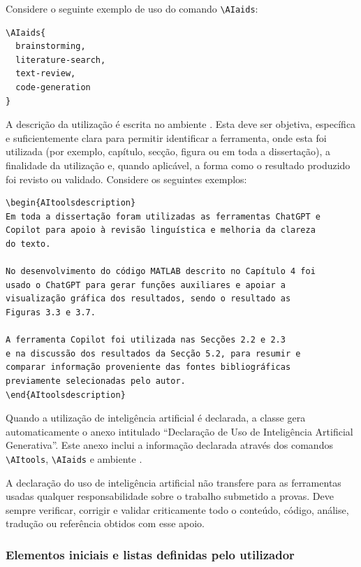 Considere o seguinte exemplo de uso do comando \verb|\AIaids|:
\begin{verbatim}
\AIaids{
  brainstorming,
  literature-search,
  text-review,
  code-generation
}
\end{verbatim}

A descrição da utilização é escrita no ambiente . Esta deve ser objetiva, específica e suficientemente clara para permitir identificar a ferramenta, onde esta foi utilizada (por exemplo, capítulo, secção, figura ou em toda a dissertação), a finalidade da utilização e, quando aplicável, a forma como o resultado produzido foi revisto ou validado. Considere os seguintes exemplos:

\begin{verbatim}
\begin{AItoolsdescription}
Em toda a dissertação foram utilizadas as ferramentas ChatGPT e
Copilot para apoio à revisão linguística e melhoria da clareza
do texto.

No desenvolvimento do código MATLAB descrito no Capítulo 4 foi
usado o ChatGPT para gerar funções auxiliares e apoiar a
visualização gráfica dos resultados, sendo o resultado as
Figuras 3.3 e 3.7.

A ferramenta Copilot foi utilizada nas Secções 2.2 e 2.3
e na discussão dos resultados da Secção 5.2, para resumir e
comparar informação proveniente das fontes bibliográficas
previamente selecionadas pelo autor.
\end{AItoolsdescription}
\end{verbatim}

Quando a utilização de inteligência artificial é declarada, a classe gera automaticamente o anexo intitulado ``Declaração de Uso de Inteligência Artificial Generativa''. Este anexo inclui a informação declarada através dos comandos \verb|\AItools|, \verb|\AIaids| e ambiente .

A declaração do uso de inteligência artificial não transfere para as ferramentas usadas qualquer responsabilidade sobre o trabalho submetido a provas. Deve sempre verificar, corrigir e validar criticamente todo o conteúdo, código, análise, tradução ou referência obtidos com esse apoio.

\subsubsection*{Elementos iniciais e listas definidas pelo utilizador}

